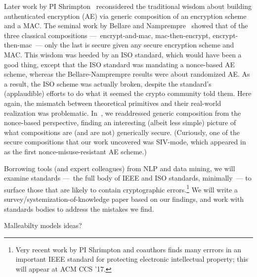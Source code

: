 Later work by PI Shrimpton~\cite{NRS} reconsidered the traditional wisdom about
building authenticated encryption (AE) via generic composition of an encryption
scheme and a MAC.   The seminal work by Bellare and Namprempre~\cite{BN} showed
that of the three classical compositions ---~encrypt-and-mac, mac-then-encrypt,
encrypt-then-mac~--- only the last is secure given any secure encryption scheme
and MAC.   This wisdom was heeded by an ISO standard, which would have been a
good thing, except that the ISO standard was mandating a nonce-based AE scheme,
whereas the Bellare-Namprempre results were about randomized AE.  As a result,
the ISO scheme was actually broken, despite the standard's (applaudible) efforts
to do what it seemed the crypto community told them.  Here again, the mismatch
between theoretical primitives and their real-world realization was problematic.
In~\cite{NRS}, we readdressed generic composition from the nonce-based
perspective, finding an interesting (albeit less simple) picture of what
compositions are (and are not) generically secure.  (Curiously, one of the
secure compositions that our work uncovered was SIV-mode, which
appeared in~\cite{RS06} as the first nonce-misuse-resistant AE scheme.)

\begin{task}
Borrowing tools (and expert colleagues) from NLP and data mining, we
will examine standards ---~the full body of IEEE and ISO standards,
minimally~--- to surface those that are likely to contain cryptographic
errors.\footnote{Very recent work by PI Shrimpton and coauthors finds many
errrors in an important IEEE standard for protecting electronic
intellectual property; this will appear at ACM CCS '17.}  We will
write a survey/systemization-of-knowledge paper based on our findings, and work with standards
bodies to address the mistakes we find.  
\end{task}




\begin{task}
Malleabilty models ideas?
\end{task}

